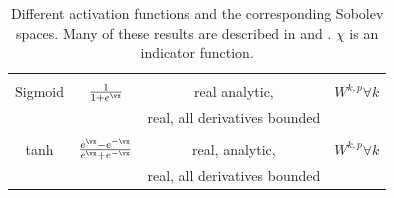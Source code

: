 \begin{table}[!tb]
{\begin{tabular}{cccc}
\\ & & &  \\ 
Sigmoid & $ \frac{1}{1+ e^{\vx} } $ & real analytic,  & $W^{k,p} \forall k $ \\
&  & real, all derivatives bounded &  
\\ & & &  \\ 
tanh & $ \frac{e^{\vx} - e^{-\vx}}{e^{\vx} + e^{-\vx}} $ & real, analytic,  & $W^{k,p} \forall k $ \\
&  & real, all derivatives bounded &  \\
\bottomrule
\end{tabular}
}
\caption{Different activation functions and the corresponding Sobolev spaces. Many of these results are described in 
\cite{petersenTopologicalPropertiesSet2021a}  and \cite{adegokeHigherDerivativesInverse2016} . $\chi$ is an indicator function.}
\label{tab:Sobolev_acti}
\end{table}

